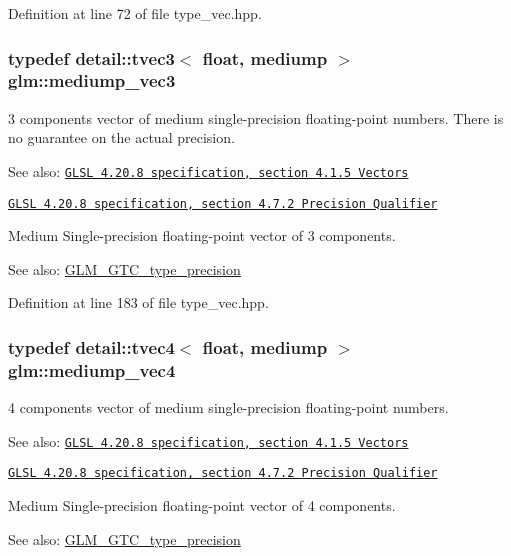 Definition at line 72 of file type\_\-vec.hpp.\hypertarget{group__core__precision_g10acc767a046b85205f52ce7f834626f}{
\subsubsection[mediump\_\-vec3]{\setlength{\rightskip}{0pt plus 5cm}typedef detail::tvec3$<$ float, mediump $>$ {\bf glm::mediump\_\-vec3}}}
\label{group__core__precision_g10acc767a046b85205f52ce7f834626f}


3 components vector of medium single-precision floating-point numbers. There is no guarantee on the actual precision.

\begin{Desc}
\item[See also:]\href{http://www.opengl.org/registry/doc/GLSLangSpec.4.20.8.pdf}{\tt GLSL 4.20.8 specification, section 4.1.5 Vectors} 

\href{http://www.opengl.org/registry/doc/GLSLangSpec.4.20.8.pdf}{\tt GLSL 4.20.8 specification, section 4.7.2 Precision Qualifier}\end{Desc}
Medium Single-precision floating-point vector of 3 components. \begin{Desc}
\item[See also:]\hyperlink{group__gtc__type__precision}{GLM\_\-GTC\_\-type\_\-precision} \end{Desc}


Definition at line 183 of file type\_\-vec.hpp.\hypertarget{group__core__precision_g2527a7f322907fecd58bef0a7a9c3ecd}{
\subsubsection[mediump\_\-vec4]{\setlength{\rightskip}{0pt plus 5cm}typedef detail::tvec4$<$ float, mediump $>$ {\bf glm::mediump\_\-vec4}}}
\label{group__core__precision_g2527a7f322907fecd58bef0a7a9c3ecd}


4 components vector of medium single-precision floating-point numbers.

\begin{Desc}
\item[See also:]\href{http://www.opengl.org/registry/doc/GLSLangSpec.4.20.8.pdf}{\tt GLSL 4.20.8 specification, section 4.1.5 Vectors} 

\href{http://www.opengl.org/registry/doc/GLSLangSpec.4.20.8.pdf}{\tt GLSL 4.20.8 specification, section 4.7.2 Precision Qualifier}\end{Desc}
Medium Single-precision floating-point vector of 4 components. \begin{Desc}
\item[See also:]\hyperlink{group__gtc__type__precision}{GLM\_\-GTC\_\-type\_\-precision} \end{Desc}


